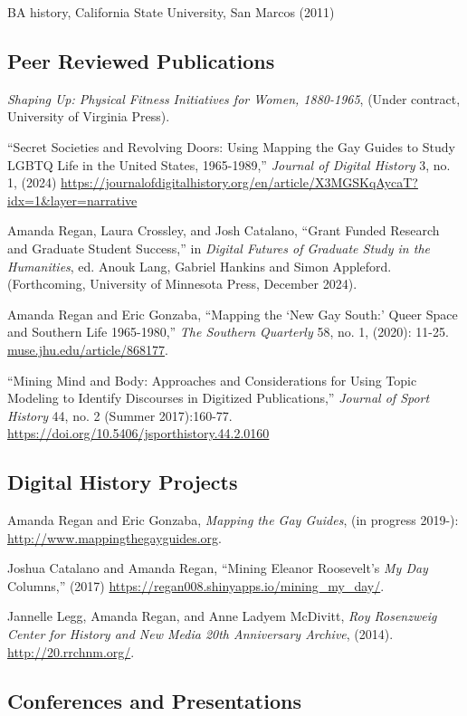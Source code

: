 \documentclass[11pt]{article}
\begin{document}
BA history, California State University, San Marcos (2011)


\subsection{Peer Reviewed Publications}\label{peer-reviewed}

\emph{Shaping Up: Physical Fitness Initiatives for Women, 1880-1965}, (Under contract, University of Virginia Press).

``Secret Societies and Revolving Doors: Using Mapping the Gay Guides to Study LGBTQ Life in the United States, 1965-1989,'' \emph{Journal of Digital History} 3, no. 1, (2024) \url{https://journalofdigitalhistory.org/en/article/X3MGSKqAycaT?idx=1&layer=narrative}

Amanda Regan, Laura Crossley, and Josh Catalano, ``Grant Funded Research and Graduate Student Success,'' in \emph{Digital Futures of Graduate Study in the Humanities}, ed. Anouk Lang, Gabriel Hankins and Simon Appleford. (Forthcoming, University of Minnesota Press, December 2024).

Amanda Regan and Eric Gonzaba, ``Mapping the `New Gay South:' Queer Space and Southern Life 1965-1980,'' \emph{The Southern Quarterly} 58, no. 1, (2020): 11-25. \url{muse.jhu.edu/article/868177}.

``Mining Mind and Body: Approaches and Considerations for Using Topic Modeling to Identify Discourses in Digitized Publications,'' \emph{Journal of Sport History} 44, no. 2 (Summer 2017):160-77. \url{https://doi.org/10.5406/jsporthistory.44.2.0160}

\subsection{Digital History Projects}
Amanda Regan and Eric Gonzaba, \emph{Mapping the Gay Guides}, (in progress 2019-): \url{http://www.mappingthegayguides.org}.

Joshua Catalano and Amanda Regan, ``Mining Eleanor Roosevelt's \emph{My Day} Columns,'' (2017) \url{https://regan008.shinyapps.io/mining_my_day/}.

Jannelle Legg, Amanda Regan, and Anne Ladyem McDivitt, \emph{Roy Rosenzweig Center for History and New Media 20th Anniversary Archive}, (2014). \url{http://20.rrchnm.org/}.

\subsection{Conferences and Presentations}
\end{document}
